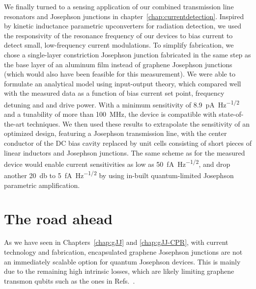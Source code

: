 We finally turned to a sensing application of our combined transmission line resonators and Josephson junctions in chapter~\ref{chap:currentdetection}.
%
Inspired by kinetic inductance parametric upconverters for radiation detection, we used the responsivity of the resonance frequency of our devices to bias current to detect small, low-frequency current modulations.
%
To simplify fabrication, we chose a single-layer constriction Josephson junction fabricated in the same step as the base layer of an aluminum film instead of graphene Josephson junctions (which would also have been feasible for this measurement).
%
We were able to formulate an analytical model using input-output theory, which compared well with the measured data as a function of bias current set point, frequency detuning and and drive power.
%
With a minimum sensitivity of \SI{8.9}{\pico\ampere\per\hertz\tothe{1/2}} and a tunability of more than \SI{100}{\mega\hertz}, the device is compatible with state-of-the-art techniques.
%
We then used these results to extrapolate the sensitivity of an optimized design, featuring a Josephson transmission line, with the center conductor of the DC bias cavity replaced by unit cells consisting of short pieces of linear inductors and Josephson junctions.
%
The same scheme as for the measured device would enable current sensitivities as low as \SI{50}{\femto\ampere\per\hertz\tothe{1/2}}, and drop another \SI{20}{\decibel} to \SI{5}{\femto\ampere\per\hertz\tothe{1/2}} by using in-built quantum-limited Josephson parametric amplification.

\section{The road ahead}



As we have seen in Chapters~\ref{chap:gJJ} and \ref{chap:gJJ-CPR}, with current technology and fabrication, encapsulated graphene Josephson junctions are not an immediately scalable option for quantum Josephson devices.
%
This is mainly due to the remaining high intrinsic losses, which are likely limiting graphene transmon qubits such as the ones in Refs.~\cite{krollMagneticFieldCompatible2018,wangCoherentControlHybrid2019}.

